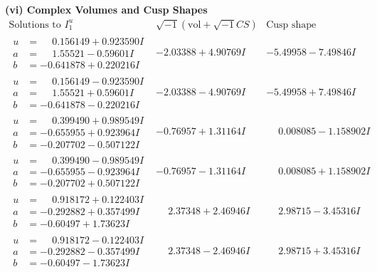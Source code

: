 \documentclass[1p]{elsarticle_modified}
\theoremstyle{definition}
\newcommand{\I}{\sqrt{-1}}
\begin{document}
\newpage\flushleft \textbf{(vi) Complex Volumes and Cusp Shapes}
$$\begin{array}{c|c|c}  
\text{Solutions to }I^u_{1}& \I (\text{vol} + \sqrt{-1}CS) & \text{Cusp shape}\\
 \hline 
\begin{aligned}
u &= \phantom{-}0.156149 + 0.923590 I \\
a &= \phantom{-}1.55521 - 0.59601 I \\
b &= -0.641878 + 0.220216 I\end{aligned}
 & -2.03388 + 4.90769 I & -5.49958 - 7.49846 I \\ \hline\begin{aligned}
u &= \phantom{-}0.156149 - 0.923590 I \\
a &= \phantom{-}1.55521 + 0.59601 I \\
b &= -0.641878 - 0.220216 I\end{aligned}
 & -2.03388 - 4.90769 I & -5.49958 + 7.49846 I \\ \hline\begin{aligned}
u &= \phantom{-}0.399490 + 0.989549 I \\
a &= -0.655955 + 0.923964 I \\
b &= -0.207702 - 0.507122 I\end{aligned}
 & -0.76957 + 1.31164 I & \phantom{-}0.008085 - 1.158902 I \\ \hline\begin{aligned}
u &= \phantom{-}0.399490 - 0.989549 I \\
a &= -0.655955 - 0.923964 I \\
b &= -0.207702 + 0.507122 I\end{aligned}
 & -0.76957 - 1.31164 I & \phantom{-}0.008085 + 1.158902 I \\ \hline\begin{aligned}
u &= \phantom{-}0.918172 + 0.122403 I \\
a &= -0.292882 + 0.357499 I \\
b &= -0.60497 + 1.73623 I\end{aligned}
 & \phantom{-}2.37348 + 2.46946 I & \phantom{-}2.98715 - 3.45316 I \\ \hline\begin{aligned}
u &= \phantom{-}0.918172 - 0.122403 I \\
a &= -0.292882 - 0.357499 I \\
b &= -0.60497 - 1.73623 I\end{aligned}
 & \phantom{-}2.37348 - 2.46946 I & \phantom{-}2.98715 + 3.45316 I \\ \hline\begin{aligned}

\end{aligned}
\end{array}$$
\end{document}
